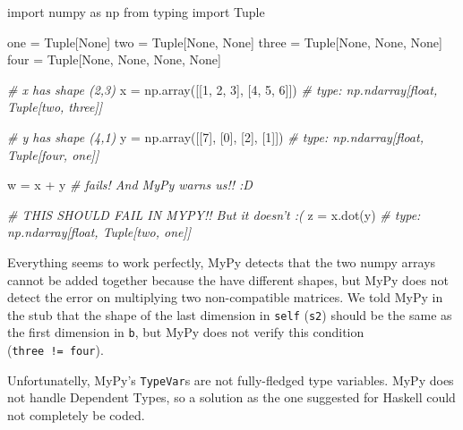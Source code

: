 \documentclass[
11pt, %
english, %
singlespacing, %
headsepline, %
]{MastersDoctoralThesis} %
\newenvironment{Shaded}{}{}
\newcommand{\CommentTok}[1]{\textcolor[rgb]{0.38,0.63,0.69}{\textit{#1}}}
\newcommand{\DecValTok}[1]{\textcolor[rgb]{0.25,0.63,0.44}{#1}}
\newcommand{\ImportTok}[1]{#1}
\newcommand{\NormalTok}[1]{#1}
\newcommand{\OperatorTok}[1]{\textcolor[rgb]{0.40,0.40,0.40}{#1}}
\newcommand{\VariableTok}[1]{\textcolor[rgb]{0.10,0.09,0.49}{#1}}
\begin{document}
\begin{Shaded}
\begin{Highlighting}[]
\ImportTok{import}\NormalTok{ numpy }\ImportTok{as}\NormalTok{ np}
\ImportTok{from}\NormalTok{ typing }\ImportTok{import}\NormalTok{ Tuple}

\NormalTok{one   }\OperatorTok{=}\NormalTok{ Tuple[}\VariableTok{None}\NormalTok{]}
\NormalTok{two   }\OperatorTok{=}\NormalTok{ Tuple[}\VariableTok{None}\NormalTok{, }\VariableTok{None}\NormalTok{]}
\NormalTok{three }\OperatorTok{=}\NormalTok{ Tuple[}\VariableTok{None}\NormalTok{, }\VariableTok{None}\NormalTok{, }\VariableTok{None}\NormalTok{]}
\NormalTok{four  }\OperatorTok{=}\NormalTok{ Tuple[}\VariableTok{None}\NormalTok{, }\VariableTok{None}\NormalTok{, }\VariableTok{None}\NormalTok{, }\VariableTok{None}\NormalTok{]}

\CommentTok{# x has shape (2,3)}
\NormalTok{x }\OperatorTok{=}\NormalTok{ np.array([[}\DecValTok{1}\NormalTok{, }\DecValTok{2}\NormalTok{, }\DecValTok{3}\NormalTok{], [}\DecValTok{4}\NormalTok{, }\DecValTok{5}\NormalTok{, }\DecValTok{6}\NormalTok{]])  }\CommentTok{# type: np.ndarray[float, Tuple[two, three]]}

\CommentTok{# y has shape (4,1)}
\NormalTok{y }\OperatorTok{=}\NormalTok{ np.array([[}\DecValTok{7}\NormalTok{], [}\DecValTok{0}\NormalTok{], [}\DecValTok{2}\NormalTok{], [}\DecValTok{1}\NormalTok{]])    }\CommentTok{# type: np.ndarray[float, Tuple[four, one]]}

\NormalTok{w }\OperatorTok{=}\NormalTok{ x }\OperatorTok{+}\NormalTok{ y  }\CommentTok{# fails! And MyPy warns us!! :D}

\CommentTok{# THIS SHOULD FAIL IN MYPY!! But it doesn't :(}
\NormalTok{z }\OperatorTok{=}\NormalTok{ x.dot(y)  }\CommentTok{# type: np.ndarray[float, Tuple[two, one]]}
\end{Highlighting}
\end{Shaded}

Everything seems to work perfectly, MyPy detects that the two numpy
arrays cannot be added together because the have different shapes, but
MyPy does not detect the error on multiplying two non-compatible
matrices. We told MyPy in the stub that the shape of the last dimension
in \texttt{self} (\texttt{s2}) should be the same as the first dimension
in \texttt{b}, but MyPy does not verify this condition
(\texttt{three\ !=\ four}).

Unfortunatelly, MyPy's \texttt{TypeVar}s are not fully-fledged type
variables. MyPy does not handle Dependent Types, so a solution as the
one suggested for Haskell could not completely be coded.
\end{document}
